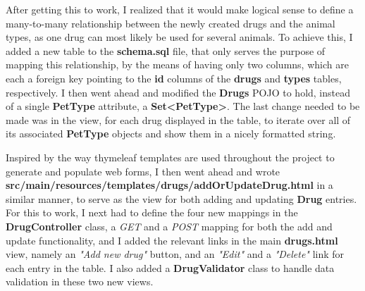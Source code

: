 \documentclass[12pt, a4paper]{article}
\begin{document}
After getting this to work, I realized that it would make logical sense to define a many-to-many relationship between the newly created drugs and the animal types, as one drug can most likely be used for several animals. To achieve this, I added a new table to the \textbf{schema.sql} file, that only serves the purpose of mapping this relationship, by the means of having only two columns, which are each a foreign key pointing to the \textbf{id} columns of the \textbf{drugs} and \textbf{types} tables, respectively. I then went ahead and modified the \textbf{Drugs} POJO to hold, instead of a single \textbf{PetType} attribute, a \textbf{Set<PetType>}. The last change needed to be made was in the view, for each drug displayed in the table, to iterate over all of its associated \textbf{PetType} objects and show them in a nicely formatted string.

Inspired by the way thymeleaf templates are used throughout the project to generate and populate web forms, I then went ahead and wrote \textbf{src/main/resources/templates/drugs/addOrUpdateDrug.html} in a similar manner, to serve as the view for both adding and updating \textbf{Drug} entries. For this to work, I next had to define the four new mappings in the \textbf{DrugController} class, a \textit{GET} and a \textit{POST} mapping for both the add and update functionality, and I added the relevant links in the main \textbf{drugs.html} view, namely an \textit{"Add new drug"} button, and an \textit{"Edit"} and a \textit{"Delete"} link for each entry in the table. I also added a \textbf{DrugValidator} class to handle data validation in these two new views.
\end{document}
